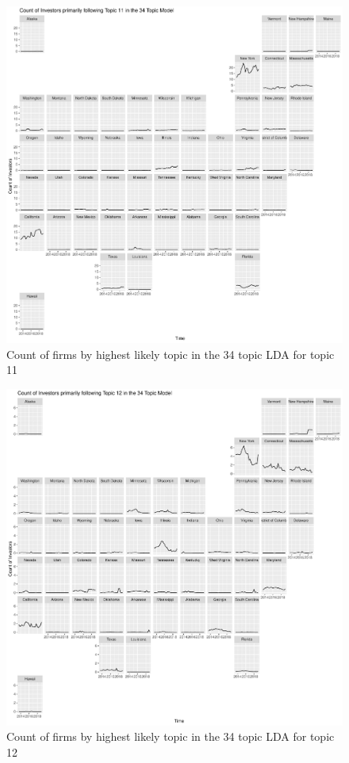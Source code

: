 		\begin{figure}
		\centering
		\includegraphics[width=1\linewidth]{Figures/ChapterV/USA_34_Topic11.pdf}
		\caption[Count of Firms for Topic 11 by Quarter]{Count of firms by highest likely topic in the 34 topic LDA for topic 11}
		\label{fig:StateLDA11}
	\end{figure}
	
		\begin{figure}
		\centering
		\includegraphics[width=1\linewidth]{Figures/ChapterV/USA_34_Topic12.pdf}
		\caption[Count of Firms for Topic 12 by Quarter]{Count of firms by highest likely topic in the 34 topic LDA for topic 12}
		\label{fig:StateLDA12}
	\end{figure}
	
